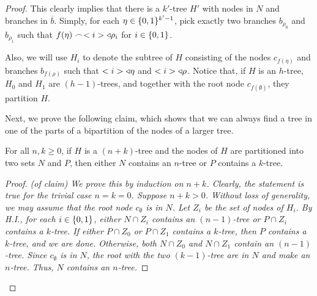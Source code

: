 \begin{theorem}
\begin{proof}
            This clearly implies that there is a $k'$-tree $H'$ with nodes in $N$ and branches in $\overline{b}$.
            Simply, for each $\eta \in \{ 0,1 \}^{k'-1}$, pick exactly two branches $b_{\rho_0}$ and $b_{\rho_1}$ such that
            $f(\eta)\frown< i > \triangleleft \rho_i$ for $i \in \{ 0,1 \}$.

            Also, we will use $H_i$ to denote the subtree of $H$ consisting of the nodes $c_{f(\eta)}$ and branches
            $b_{f(\rho)}$ such that $< i > \triangleleft \eta$ and $< i > \triangleleft \rho$.
            Notice that, if $H$ is an $h$-tree, $H_0$ and $H_1$ are $(h-1)$-trees, and together with the root node
            $c_{f(\emptyset)}$, they partition $H$.

            Next, we prove the following claim, which shows that we can always find a tree
            in one of the parts of a bipartition of the nodes of a larger tree.

            \begin{claim}
                For all $n, k \geq 0$, if $H$ is a $(n + k)$-tree and the nodes of $H$ are partitioned into two sets $N$ and $P$,
                then either $N$ contains an $n$-tree or $P$ contains a $k$-tree.
                \begin{proof} \it{(of claim)}
                    We prove this by induction on $n + k$.
                    Clearly, the statement is true for the trivial case $n = k = 0$.
                    Suppose $n + k > 0$.
                    Without loss of generality, we may assume that the root node $c_\emptyset$ is in $N$.
                    Let $Z_i$ be the set of nodes of $H_i$.
                    By H.I., for each $i \in \{ 0,1 \}$, either $N \cap Z_i$ contains an $(n-1)$-tree or
                    $P \cap Z_i$ contains a $k$-tree.
                    If either $P \cap Z_0$ or $P \cap Z_1$ contains a $k$-tree, then $P$ contains a $k$-tree, and we are done.
                    Otherwise, both $N \cap Z_0$ and $N \cap Z_1$ contain an $(n-1)$-tree.
                    Since $c_\emptyset$ is in $N$, the root with the two $(k-1)$-tree are in $N$ and make an $n$-tree.
                    Thus, $N$ contains an $n$-tree.
                \end{proof}
            \end{claim}


\end{proof}
\end{theorem}
